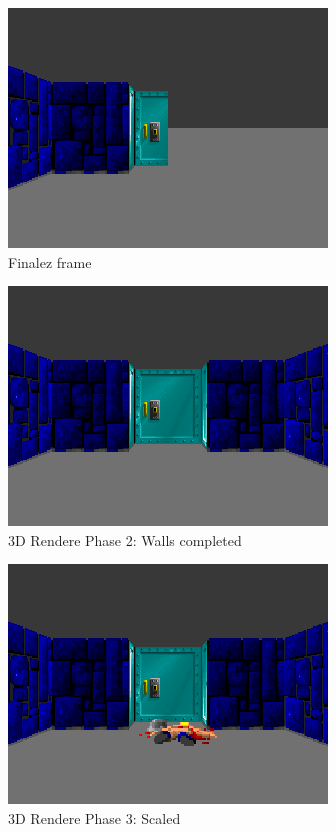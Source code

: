 \begin{figure}[H]
 \centering
  \includegraphics[scale=1.3]{screenshots/wolf3d_5_partialwalls_160rays.png}
 \caption{Finalez frame} 
 \label{fig:mips}
\end{figure}
 
 
 \begin{figure}[H]
\centering
 \includegraphics[scale=1.3]{screenshots/wolf4d_2_walls.png}
 \caption{3D Rendere Phase 2: Walls completed} \label{fig:mips}
 \end{figure}
 
 
 \begin{figure}[H]
\centering
 \includegraphics[scale=1.3]{screenshots/wolf3d_6_scaled}
 \caption{3D Rendere Phase 3: Scaled} \label{fig:mips}
 \end{figure}

